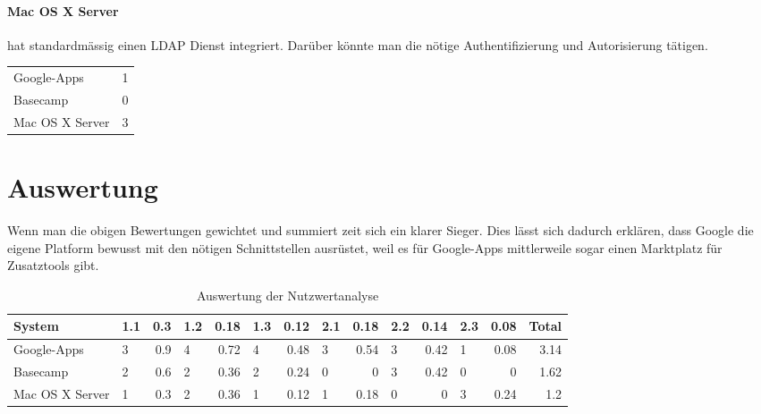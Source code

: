 \paragraph{Mac OS X Server}
\label{par:2.3Mac OS X Server}
hat standardmässig einen LDAP Dienst integriert. Darüber könnte man die nötige
Authentifizierung und Autorisierung tätigen.

\begin{tabular}{lc}
Google-Apps & 1\\
Basecamp & 0\\
Mac OS X Server & 3\\
\end{tabular}

\section{Auswertung}
\label{sec:Auswertung}
Wenn man die obigen Bewertungen gewichtet und summiert zeit sich ein klarer
Sieger. Dies lässt sich dadurch erklären, dass Google die eigene Platform
bewusst mit den nötigen Schnittstellen ausrüstet, weil es für Google-Apps
mittlerweile sogar einen Marktplatz für Zusatztools gibt.

\begin{table}[h!]
  \centering
  \begin{tabular}{|l|lr|lr|lr|lr|lr|lr|r|}
  \hline
  System & 1.1 & 0.3 & 1.2 & 0.18 & 1.3 & 0.12 & 2.1 & 0.18 & 2.2 & 0.14 & 2.3 & 0.08 & Total\\
  \hline
  Google-Apps & 3 & 0.9 & 4 & 0.72 & 4 & 0.48 & 3 & 0.54 & 3 & 0.42 & 1 & 0.08 & 3.14\\
  \hline
  Basecamp & 2 & 0.6 & 2 & 0.36 & 2 & 0.24 & 0 & 0 & 3 & 0.42 & 0 & 0 & 1.62\\
  \hline
  Mac OS X Server & 1 & 0.3 & 2 & 0.36 & 1 & 0.12 & 1 & 0.18 & 0 & 0 & 3 & 0.24 & 1.2\\
  \hline
  \end{tabular}
  \label{tab:auswertung_nutzwertanalyse}
  \caption{Auswertung der Nutzwertanalyse}
\end{table}